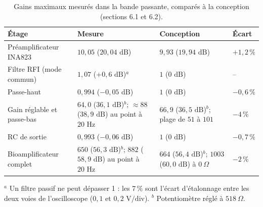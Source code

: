\documentclass[11pt,letterpaper]{article}
\begin{document}
\begin{table}[H]
\centering
\caption{Gains maximaux mesurés dans la bande passante, comparés à la conception (sections 6.1 et 6.2).}
\label{tab:gains_mesures}
\small
\begin{tabular}{L{4.3cm}L{4.4cm}L{3.6cm}L{2.3cm}}
\toprule
\textbf{Étage} & \textbf{Mesure} & \textbf{Conception} & \textbf{Écart} \\
\midrule
Préamplificateur INA823 & $10,05$ ($20,04\text{ dB}$) & $9,93$ ($19,94\text{ dB}$) & $+1,2\,\%$ \\
Filtre RFI (mode commun) & $1,07$ ($+0,6\text{ dB}$)$^{a}$ & $1$ ($0\text{ dB}$) & -- \\
Passe-haut & $0,994$ ($-0,05\text{ dB}$) & $1$ ($0\text{ dB}$) & $-0,6\,\%$ \\
Gain réglable et passe-bas & $64,0$ ($36,1\text{ dB}$)$^{b}$; $\approx 88$ ($38,9\text{ dB}$) au point à $20\text{ Hz}$ & $66,9$ ($36,5\text{ dB}$)$^{b}$; plage de $51$ à $101$ & $-4\,\%$ \\
RC de sortie & $0,993$ ($-0,06\text{ dB}$) & $1$ ($0\text{ dB}$) & $-0,7\,\%$ \\
\midrule
Bioamplificateur complet & $650$ ($56,3\text{ dB}$)$^{b}$; $882$ ($58,9\text{ dB}$) au point à $20\text{ Hz}$ & $664$ ($56,4\text{ dB}$)$^{b}$; $1003$ ($60,0\text{ dB}$) à $0\ \Omega$ & $-2\,\%$ \\
\bottomrule
\end{tabular}

\smallskip
{\footnotesize $^{a}$ Un filtre passif ne peut dépasser 1 : les $7\,\%$ sont l'écart d'étalonnage entre les deux voies de l'oscilloscope ($0,1$ et $0,2\text{ V/div}$). $^{b}$ Potentiomètre réglé à $518\ \Omega$.}
\end{table}
\end{document}
